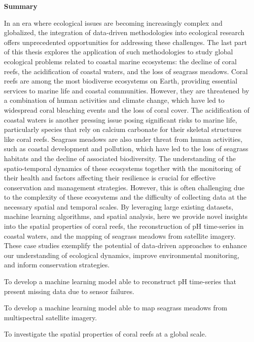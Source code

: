 \thispagestyle{empty}

\begin{center}
    \textbf{\Large Summary}
\end{center}

In an era where ecological issues are becoming increasingly complex and
globalized, the integration of data-driven methodologies into ecological
research offers unprecedented opportunities for addressing these challenges.
The last part of this thesis explores the application of such methodologies to
study global ecological problems related to coastal marine ecosystems: the
decline of coral reefs, the acidification of coastal waters, and the loss of
seagrass meadows. Coral reefs are among the most biodiverse ecosystems on
Earth, providing essential services to marine life and coastal communities.
However, they are threatened by a combination of human activities and climate
change, which have led to widespread coral bleaching events and the loss of
coral cover. The acidification of coastal waters is another pressing issue
posing significant risks to marine life, particularly species that rely on
calcium carbonate for their skeletal structures like coral reefs. Seagrass
meadows are also under threat from human activities, such as coastal
development and pollution, which have led to the loss of seagrass habitats and
the decline of associated biodiversity. The understanding of the
spatio-temporal dynamics of these ecosystems together with the monitoring of
their health and factors affecting their resilience is crucial for effective
conservation and management strategies. However, this is often challenging due
to the complexity of these ecosystems and the difficulty of collecting data at
the necessary spatial and temporal scales. By leveraging large existing
datasets, machine learning algorithms, and spatial analysis, here we provide
novel insights into the spatial properties of coral reefs, the reconstruction
of pH time-series in coastal waters, and the mapping of seagrass meadows from
satellite imagery. These case studies exemplify the potential of data-driven
approaches to enhance our understanding of ecological dynamics, improve
environmental monitoring, and inform conservation strategies.

\vspace{1cm}

\begin{objectiveslist}
    \item To develop a machine learning model able to reconstruct pH
    time-series that present missing data due to sensor failures.
    \item To develop a machine learning model able to map seagrass meadows from
    multispectral satellite imagery.
    \item To investigate the spatial properties of coral reefs at a global
    scale.
\end{objectiveslist}

